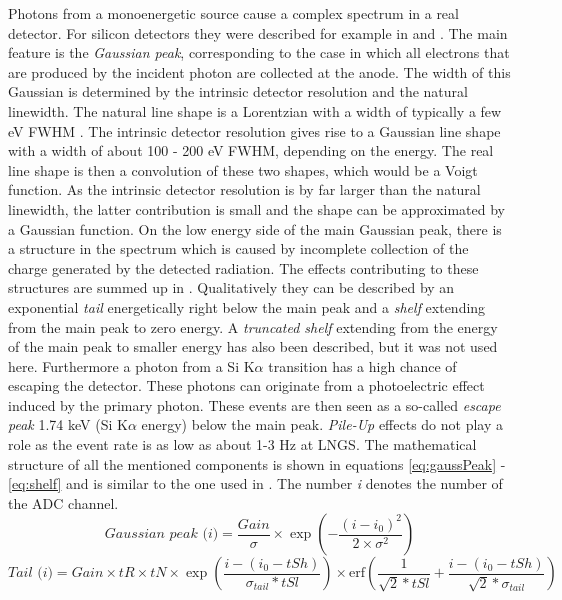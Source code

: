 Photons from a monoenergetic source cause a complex spectrum in a real detector. For silicon detectors they were described for example in \cite{Campbell2001} and \cite{Okada}. The main feature is the \textit{Gaussian peak}, corresponding to the case in which all electrons that are produced by the incident photon are collected at the anode. The width of this Gaussian is determined by the intrinsic detector resolution and the natural linewidth. The natural line shape is a Lorentzian with a width of typically a few eV FWHM \cite{Krause1979}. The intrinsic detector resolution gives rise to a Gaussian line shape with a width of about 100 - 200 eV FWHM, depending on the energy. The real line shape is then a convolution of these two shapes, which would be a Voigt function. As the intrinsic detector resolution is by far larger than the natural linewidth, the latter contribution is small and the shape can be approximated by a Gaussian function. On the low energy side of the main Gaussian peak, there is a structure in the spectrum which is caused by incomplete collection of the charge generated by the detected radiation. The effects contributing to these structures are summed up in \cite{Campbell2001}. Qualitatively they can be described by an exponential \textit{tail} energetically right below the main peak and a \textit{shelf} extending from the main peak to zero energy. A \textit{truncated shelf} extending from the energy of the main peak to smaller energy has also been described, but it was not used here. Furthermore a photon from a Si K$\alpha$ transition has a high chance of escaping the detector. These photons can originate from a photoelectric effect induced by the primary photon. These events are then seen as a so-called \textit{escape peak} 1.74 keV (Si K$\alpha$ energy) below the main peak. \textit{Pile-Up}  effects do not play a role as the event rate is as low as about 1-3 Hz at LNGS. The mathematical structure of all the mentioned components is shown in equations \ref{eq:gaussPeak} - \ref{eq:shelf} and is similar to the one used in \cite{Okada}. The number \textit{i} denotes the number of the ADC channel.
\begin{equation}
 \textit{Gaussian peak (i)} = \frac{Gain}{\sigma} \times \exp(-\frac{(i-i_{0})^{2}}{2 \times \sigma^{2}})
 \label{eq:gaussPeak}
\end{equation} 
\begin{equation}
 \textit{Tail (i)} = Gain \times tR \times tN \times \exp(\frac{i-(i_{0}-tSh)}{\sigma_{tail}*tSl}) \times \textrm{erf}(\frac{1}{\sqrt{2}*tSl}+\frac{i-(i_{0}-tSh)}{\sqrt{2}*\sigma_{tail}})
\end{equation} 

